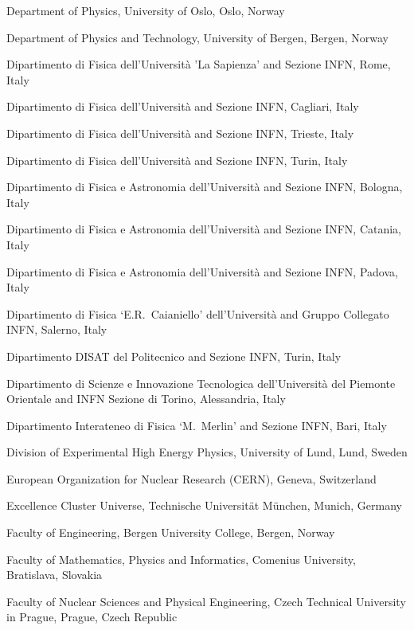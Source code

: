 \begin{flushleft}
\begin{Authlist}
\item {}Department of Physics, University of Oslo, Oslo, Norway
\item {}Department of Physics and Technology, University of Bergen, Bergen, Norway
\item {}Dipartimento di Fisica dell'Universit\`{a} 'La Sapienza' and Sezione INFN, Rome, Italy
\item {}Dipartimento di Fisica dell'Universit\`{a} and Sezione INFN, Cagliari, Italy
\item {}Dipartimento di Fisica dell'Universit\`{a} and Sezione INFN, Trieste, Italy
\item {}Dipartimento di Fisica dell'Universit\`{a} and Sezione INFN, Turin, Italy
\item {}Dipartimento di Fisica e Astronomia dell'Universit\`{a} and Sezione INFN, Bologna, Italy
\item {}Dipartimento di Fisica e Astronomia dell'Universit\`{a} and Sezione INFN, Catania, Italy
\item {}Dipartimento di Fisica e Astronomia dell'Universit\`{a} and Sezione INFN, Padova, Italy
\item {}Dipartimento di Fisica `E.R.~Caianiello' dell'Universit\`{a} and Gruppo Collegato INFN, Salerno, Italy
\item {}Dipartimento DISAT del Politecnico and Sezione INFN, Turin, Italy
\item {}Dipartimento di Scienze e Innovazione Tecnologica dell'Universit\`{a} del Piemonte Orientale and INFN Sezione di Torino, Alessandria, Italy
\item {}Dipartimento Interateneo di Fisica `M.~Merlin' and Sezione INFN, Bari, Italy
\item {}Division of Experimental High Energy Physics, University of Lund, Lund, Sweden
\item {}European Organization for Nuclear Research (CERN), Geneva, Switzerland
\item {}Excellence Cluster Universe, Technische Universit\"{a}t M\"{u}nchen, Munich, Germany
\item {}Faculty of Engineering, Bergen University College, Bergen, Norway
\item {}Faculty of Mathematics, Physics and Informatics, Comenius University, Bratislava, Slovakia
\item {}Faculty of Nuclear Sciences and Physical Engineering, Czech Technical University in Prague, Prague, Czech Republic

\end{Authlist}
\end{flushleft}
